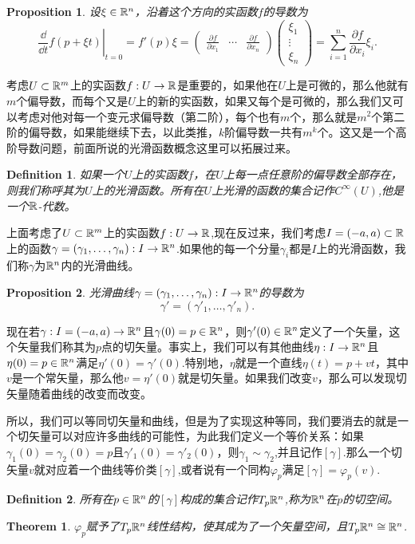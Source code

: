 \documentclass[8pt]{book}
\theoremstyle{plain}%
\newtheorem{pro}{Proposition}[section]%
\newtheorem{theo}{Theorem}[section]%
\newtheorem{defi}{Definition}[section]%
\begin{document}
\begin{pro}
设$\xi \in \mathbb{R}^n$，沿着这个方向的实函数$f$的导数为
\[
\left.\frac{\dd}{\dd t}f(p+\xi t)\right|_{t=0}=f'(p)\xi=
\begin{pmatrix}
\frac{\partial f}{\partial x_1}&\cdots&\frac{\partial f}{\partial x_n}
\end{pmatrix}
\begin{pmatrix}
\xi_1\\
\vdots\\
\xi_n
\end{pmatrix}
=\sum_{i=1}^n \frac{\partial f}{\partial x_i}\xi_i.
\]
\end{pro}
考虑$U\subset \mathbb{R}^m$上的实函数$f:U\to \mathbb{R}$是重要的，如果他在$U$上是可微的，那么他就有$m$个偏导数，而每个又是$U$上的新的实函数，如果又每个是可微的，那么我们又可以考虑对他对每一个变元求偏导数（第二阶），每个也有$m$个，那么就是$m^2$个第二阶的偏导数，如果能继续下去，以此类推，$k$阶偏导数一共有$m^k$个。这又是一个高阶导数问题，前面所说的光滑函数概念这里可以拓展过来。
\begin{defi}
	如果一个$U$上的实函数$f$，在$U$上每一点任意阶的偏导数全部存在，则我们称呼其为$U$上的光滑函数。所有在$U$上光滑的函数的集合记作$C^\infty(U)$,他是一个$\mathbb{R}$-代数。
\end{defi}
上面考虑了$U\subset \mathbb{R}^m$上的实函数$f:U\to \mathbb{R}$,现在反过来，我们考虑$I=(-a,a)\subset \mathbb{R}$上的函数$\gamma=(\gamma_1,\dots,\gamma_n):I\to \mathbb{R}^n$.如果他的每一个分量$\gamma_i$都是$I$上的光滑函数，我们称$\gamma$为$\mathbb{R}^n$内的光滑曲线。
\begin{pro}
	光滑曲线$\gamma=(\gamma_1,\dots,\gamma_n):I\to \mathbb{R}^n$的导数为
	\[
		\gamma'=(\gamma'_1,\dots,\gamma'_n).
	\]
\end{pro}
现在若$\gamma:I=(-a,a)\to \mathbb{R}^n$且$\gamma(0)=p\in \mathbb{R}^n$，则$\gamma'(0)\in \mathbb{R}^n$定义了一个矢量，这个矢量我们称其为$p$点的切矢量。事实上，我们可以有其他曲线$\eta:I\to \mathbb{R}^n$且$\eta(0)=p\in \mathbb{R}^n$满足$\eta'(0)=\gamma'(0)$.特别地，$\eta$就是一个直线$\eta(t)=p+vt$，其中$v$是一个常矢量，那么他$v=\eta'(0)$就是切矢量。如果我们改变$v$，那么可以发现切矢量随着曲线的改变而改变。

所以，我们可以等同切矢量和曲线，但是为了实现这种等同，我们要消去的就是一个切矢量可以对应许多曲线的可能性，为此我们定义一个等价关系：如果$\gamma_1(0)=\gamma_2(0)=p$且$\gamma'_1(0)=\gamma'_2(0)$，则$\gamma_1 \sim \gamma_2$,并且记作$\left[\gamma \right]$.那么一个切矢量$v$就对应着一个曲线等价类$\left[\gamma \right]$,或者说有一个同构$\varphi_p$满足$\left[\gamma \right]=\varphi_p\left(v\right)$.

\begin{defi}
	所有在$p\in \mathbb{R}^n$的$[\gamma]$构成的集合记作$T_p\mathbb{R}^n$,称为$\mathbb{R}^n$在$p$的切空间。
\end{defi}
\begin{theo}
	$\varphi_p$赋予了$T_p\mathbb{R}^n$线性结构，使其成为了一个矢量空间，且$T_p\mathbb{R}^n\cong \mathbb{R}^n$.
\end{theo}
\end{document}

